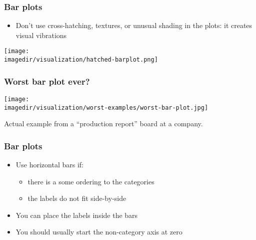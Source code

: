 \begin{frame}\frametitle{Bar plots}
	\begin{itemize}
		\item	Don't use cross-hatching, textures, or unusual shading in the plots: it creates visual vibrations 
	\end{itemize}
	\begin{center}
		\texttt{[image: \\imagedir/visualization/hatched-barplot.png]}
	\end{center}
\end{frame}

\begin{frame}\frametitle{Worst bar plot ever?}
	\begin{center}
		\texttt{[image: \\imagedir/visualization/worst-examples/worst-bar-plot.jpg]}
	\end{center}
	Actual example from a ``production report'' board at a company.
\end{frame}

\begin{frame}\frametitle{Bar plots}
	\begin{itemize}
		\item	Use horizontal bars if: 
		\begin{itemize}
			\item	there is a some ordering to the categories 
			\item	the labels do not fit side-by-side\pause 
		\end{itemize}
	\end{itemize}
	\begin{itemize}
		\item	You can place the labels inside the bars\pause 
	\end{itemize}
	\begin{itemize}
		\item	You should usually start the non-category axis at zero 
	\end{itemize}
\end{frame}

